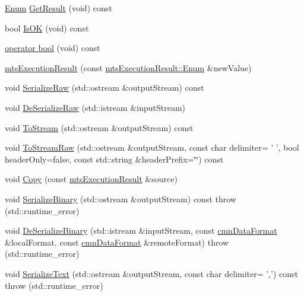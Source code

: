 \begin{DoxyCompactItemize}
\item 
\hyperlink{classmts_execution_result_a10c4246c82ac99d88e5f716f79407b77}{Enum} \hyperlink{classmts_execution_result_a97d469c280732963f2ff1bc1d3416bed}{Get\-Result} (void) const 
\item 
bool \hyperlink{classmts_execution_result_a0d14b7c78844af4128957e4e536fc7a7}{Is\-O\-K} (void) const 
\item 
\hyperlink{classmts_execution_result_a8ae076a61516dd11f7d704766347989f}{operator bool} (void) const 
\item 
\hyperlink{classmts_execution_result_a54ad2e98cdfc7ddbb888e38ca18f3596}{mts\-Execution\-Result} (const \hyperlink{classmts_execution_result_a10c4246c82ac99d88e5f716f79407b77}{mts\-Execution\-Result\-::\-Enum} \&new\-Value)
\item 
void \hyperlink{classmts_execution_result_af3a2cbc369a1e4df9314403dc29c8e54}{Serialize\-Raw} (std\-::ostream \&output\-Stream) const 
\item 
void \hyperlink{classmts_execution_result_adaf9847427fe146518ad51443df8954e}{De\-Serialize\-Raw} (std\-::istream \&input\-Stream)
\item 
void \hyperlink{classmts_execution_result_ab1f7204fb5b25846ec4475ffb2acde4e}{To\-Stream} (std\-::ostream \&output\-Stream) const 
\item 
void \hyperlink{classmts_execution_result_a9930412c7773e887c4abb1c4557de0d7}{To\-Stream\-Raw} (std\-::ostream \&output\-Stream, const char delimiter= ' ', bool header\-Only=false, const std\-::string \&header\-Prefix=\char`\"{}\char`\"{}) const 
\item 
void \hyperlink{classmts_execution_result_a33cf4e23ab0f3921d3c784868ff05909}{Copy} (const \hyperlink{classmts_execution_result}{mts\-Execution\-Result} \&source)
\item 
void \hyperlink{classmts_execution_result_a772e723fada8477465de0fb91226cbb7}{Serialize\-Binary} (std\-::ostream \&output\-Stream) const   throw (std\-::runtime\-\_\-error)
\item 
void \hyperlink{classmts_execution_result_a7d30fa2a8b6b682cb45b214fc9e589c7}{De\-Serialize\-Binary} (std\-::istream \&input\-Stream, const \hyperlink{classcmn_data_format}{cmn\-Data\-Format} \&local\-Format, const \hyperlink{classcmn_data_format}{cmn\-Data\-Format} \&remote\-Format)  throw (std\-::runtime\-\_\-error)
\item 
void \hyperlink{classmts_execution_result_a606b1a632ed11580e22f8205d4e81c1b}{Serialize\-Text} (std\-::ostream \&output\-Stream, const char delimiter= ',') const   throw (std\-::runtime\-\_\-error)

\end{DoxyCompactItemize}
